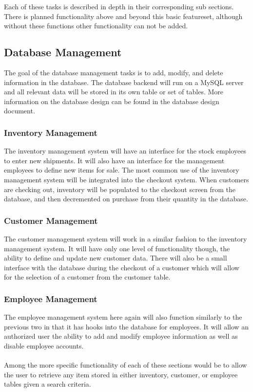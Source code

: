 \documentclass{report}
\begin{document}
Each of these tasks is described in depth in their corresponding sub sections. There is planned functionality above and beyond this basic featureset, although without these functions other functionality can not be added.

\subsection{Database Management}

The goal of the database management tasks is to add, modify, and delete information in the database. The database backend will run on a MySQL server and all relevant data will be stored in its own table or set of tables. More information on the database design can be found in the database design document.

\subsubsection{Inventory Management}
The inventory management system will have an interface for the stock employees to enter new shipments. It will also have an interface for the management employees to define new items for sale. The most common use of the inventory management system will be integrated into the checkout system. When customers are checking out, inventory will be populated to the checkout screen from the database, and then decremented on purchase from their quantity in the database.

\subsubsection{Customer Management}
The customer management system will work in a similar fashion to the inventory management system. It will have only one level of functionality though, the ability to define and update new customer data. There will also be a small interface with the database during the checkout of a customer which will allow for the selection of a customer from the customer table.

\subsubsection{Employee Management}
The employee management system here again will also function similarly to the previous two in that it has hooks into the database for employees. It will allow an authorized user the ability to add and modify employee information as well as disable employee accounts.\\
\\
Among the more specific functionality of each of these sections would be to allow the user to retrieve any item stored in either inventory, customer, or employee tables given a search criteria.
\end{document}
